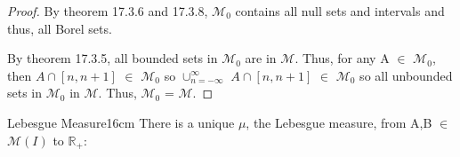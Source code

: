     \begin{proof}
        By {\color{red} theorem 17.3.6} and {\color{red} 17.3.8}, $\mathcal{M}_0$
        contains all null sets and intervals and thus, all Borel sets.

        By {\color{red} theorem 17.3.5}, all bounded sets in $\mathcal{M}_0$
        are in $\mathcal{M}$. Thus, for any A $\in$ $\mathcal{M}_0$, then
        $A \cap [n,n+1]$ $\in$ $\mathcal{M}_0$ so
        $\cup_{n=-\infty}^{\infty}$ $A \cap [n,n+1]$
        $\in$ $\mathcal{M}_0$ so all unbounded sets in $\mathcal{M}_0$
        in $\mathcal{M}$. Thus, $\mathcal{M}_0$ = $\mathcal{M}$.
    \end{proof}

    \newpage



    \begin{wtheorem}{Lebesgue Measure}{16cm}
        There is a unique $\mu$, the {\color{lblue} Lebesgue measure},
        from A,B $\in$ $\mathcal{M}(I)$ to $\mathbb{R}_+$: 
    \end{wtheorem}


